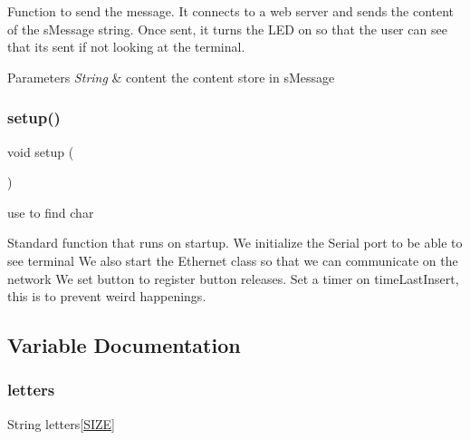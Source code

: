 Function to send the message. It connects to a web server and sends the content of the s\+Message string. Once sent, it turns the L\+ED on so that the user can see that it\textquotesingle{}s sent if not looking at the terminal.


\begin{DoxyParams}{Parameters}
{\em String} & content the content store in s\+Message \\
\hline
\end{DoxyParams}
\mbox{\label{_arduino_morse_client_8ino_a4fc01d736fe50cf5b977f755b675f11d}} 
\subsubsection{\texorpdfstring{setup()}{setup()}}
{\footnotesize\ttfamily void setup (\begin{DoxyParamCaption}{ }\end{DoxyParamCaption})}



use to find char 

Standard function that runs on startup. We initialize the Serial port to be able to see terminal We also start the Ethernet class so that we can communicate on the network We set button to register button releases. Set a timer on time\+Last\+Insert, this is to prevent weird happenings. 

\subsection{Variable Documentation}
\mbox{\label{_arduino_morse_client_8ino_a7049c41d427471a21afc889cee0f7df9}} 
\subsubsection{\texorpdfstring{letters}{letters}}
{\footnotesize\ttfamily String letters\mbox{[}\mbox{\hyperlink{_arduino_morse_client_8ino_a70ed59adcb4159ac551058053e649640}{S\+I\+ZE}}\mbox{]}}

